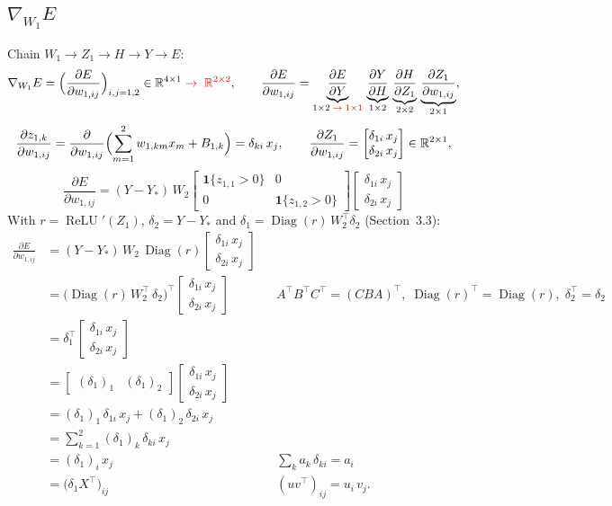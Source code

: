 \documentclass[11pt,a4paper]{article}
\newcommand{\R}{\mathbb{R}}
\newcommand{\ind}{\mathbf{1}}
\newcommand{\relu}{\operatorname{ReLU}}
\newcommand{\Diag}{\operatorname{Diag}}
\newcommand{\C}[1]{{\color{chg}#1}}          %
\newcommand{\fix}[2]{#1\;\C{\to\;#2}}         %
\begin{document}
\subsection{$\nabla_{W_1}E$}
Chain $W_1\to Z_1\to H\to Y\to E$:
\[
\nabla_{W_1}E=\Bigl(\frac{\partial E}{\partial w_{1,ij}}\Bigr)_{i,j=1,2}\in\fix{\R^{4\times1}}{\R^{2\times2}},
\qquad
\frac{\partial E}{\partial w_{1,ij}}
=\underbrace{\frac{\partial E}{\partial Y}}_{\fix{1\times2}{1\times1}}\,
 \underbrace{\frac{\partial Y}{\partial H}}_{1\times2}\,
 \underbrace{\frac{\partial H}{\partial Z_1}}_{2\times2}\,
 \underbrace{\frac{\partial Z_1}{\partial w_{1,ij}}}_{2\times1},
\]
\[
\frac{\partial z_{1,k}}{\partial w_{1,ij}}=\frac{\partial}{\partial w_{1,ij}}\Bigl(\sum_{m=1}^{2}w_{1,km}x_m+B_{1,k}\Bigr)=\delta_{ki}\,x_j,
\qquad
\frac{\partial Z_1}{\partial w_{1,ij}}=\begin{bmatrix}\delta_{1i}\,x_j\\\delta_{2i}\,x_j\end{bmatrix}\in\R^{2\times1},
\]
\[
\frac{\partial E}{\partial w_{1,ij}}=(Y-Y_*)\,W_2\begin{bmatrix}\ind\{z_{1,1}>0\}&0\\0&\ind\{z_{1,2}>0\}\end{bmatrix}
\begin{bmatrix}\delta_{1i}\,x_j\\\delta_{2i}\,x_j\end{bmatrix}
\]
{\color{chg}
With $r=\relu'(Z_1)$, $\delta_2=Y-Y_*$ and $\delta_1=\Diag(r)\,W_2^{\top}\delta_2$ (Section~3.3):
\begin{align*}
\frac{\partial E}{\partial w_{1,ij}}
&=(Y-Y_*)\,W_2\,\Diag(r)\begin{bmatrix}\delta_{1i}\,x_j\\\delta_{2i}\,x_j\end{bmatrix}
&&\\
&=\bigl(\Diag(r)\,W_2^{\top}\,\delta_2\bigr)^{\top}\begin{bmatrix}\delta_{1i}\,x_j\\\delta_{2i}\,x_j\end{bmatrix}
&&A^{\top}B^{\top}C^{\top}=(CBA)^{\top},\;\Diag(r)^{\top}=\Diag(r),\;\delta_2^{\top}=\delta_2\\
&=\delta_1^{\top}\begin{bmatrix}\delta_{1i}\,x_j\\\delta_{2i}\,x_j\end{bmatrix}
&&\\
&=\begin{bmatrix}(\delta_1)_1&(\delta_1)_2\end{bmatrix}\begin{bmatrix}\delta_{1i}\,x_j\\\delta_{2i}\,x_j\end{bmatrix}
&&\\
&=(\delta_1)_1\,\delta_{1i}\,x_j+(\delta_1)_2\,\delta_{2i}\,x_j
&&\\
&=\sum_{k=1}^{2}(\delta_1)_k\,\delta_{ki}\,x_j
&&\\
&=(\delta_1)_i\,x_j
&&\textstyle\sum_k a_k\,\delta_{ki}=a_i\\
&=\bigl(\delta_1X^{\top}\bigr)_{ij}
&&(uv^{\top})_{ij}=u_i\,v_j .
\end{align*}
}
\end{document}
